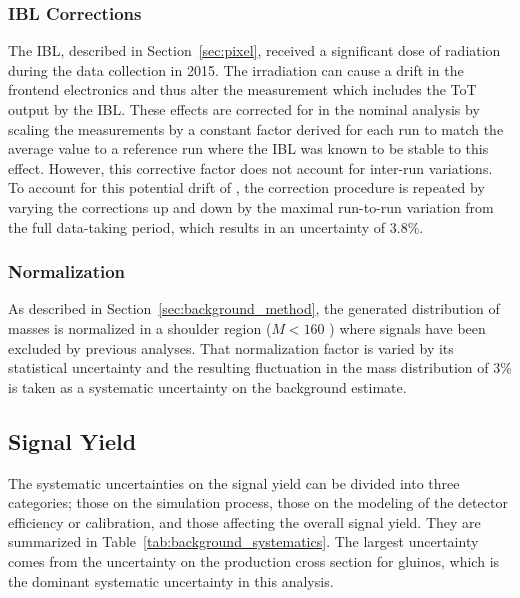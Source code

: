 \subsubsection{\acs{IBL} Corrections}

The \ac{IBL}, described in Section~\ref{sec:pixel}, received a significant dose of radiation during the data collection in 2015.
The irradiation can cause a drift in the frontend electronics and thus alter the \dedx measurement which includes the \ac{ToT} output by the \ac{IBL}.
These effects are corrected for in the nominal analysis by scaling the \dedx measurements by a constant factor derived for each run to match the average \dedx value to a reference run where the \ac{IBL} was known to be stable to this effect.
However, this corrective factor does not account for inter-run variations.
To account for this potential drift of \dedx, the correction procedure is repeated by varying the corrections up and down by the maximal run-to-run variation from the full data-taking period, which results in an uncertainty of 3.8\%.

\subsubsection{Normalization}

As described in Section~\ref{sec:background_method}, the generated distribution of masses is normalized in a shoulder region ($M < 160$ \GeV) where signals have been excluded by previous analyses.
That normalization factor is varied by its statistical uncertainty and the resulting fluctuation in the mass distribution of 3\% is taken as a systematic uncertainty on the background estimate.

\subsection{Signal Yield}

The systematic uncertainties on the signal yield can be divided into three categories; those on the simulation process, those on the modeling of the detector efficiency or calibration, and those affecting the overall signal yield.
They are summarized in Table~\ref{tab:background_systematics}.
The largest uncertainty comes from the uncertainty on the production cross section for gluinos, which is the dominant systematic uncertainty in this analysis.

